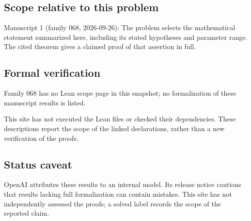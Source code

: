\documentclass[11pt]{article}
\begin{document}
\subsection{Scope relative to this problem}
Manuscript 1 (family 068, 2026-09-26): The problem selects the mathematical statement summarized here, including its stated hypotheses and parameter range. The cited theorem gives a claimed proof of that assertion in full.

\subsection{Formal verification}
Family 068 has no Lean scope page in this snapshot; no formalization of these manuscript results is listed.

This site has not executed the Lean files or checked their dependencies. These descriptions report the scope of the linked declarations, rather than a new verification of the proofs.

\subsection{Status caveat}
OpenAI attributes these results to an internal model. Its release notice cautions that results lacking full formalization can contain mistakes. This site has not independently assessed the proofs; a solved label records the scope of the reported claim.
\end{document}
